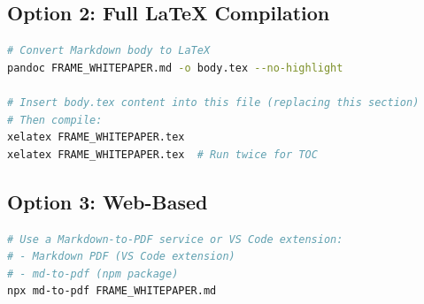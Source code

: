 \documentclass[11pt,a4paper]{article}
\begin{document}
\subsection*{Option 2: Full LaTeX Compilation}
\begin{lstlisting}[language=bash]
# Convert Markdown body to LaTeX
pandoc FRAME_WHITEPAPER.md -o body.tex --no-highlight

# Insert body.tex content into this file (replacing this section)
# Then compile:
xelatex FRAME_WHITEPAPER.tex
xelatex FRAME_WHITEPAPER.tex  # Run twice for TOC
\end{lstlisting}

\subsection*{Option 3: Web-Based}
\begin{lstlisting}[language=bash]
# Use a Markdown-to-PDF service or VS Code extension:
# - Markdown PDF (VS Code extension)
# - md-to-pdf (npm package)
npx md-to-pdf FRAME_WHITEPAPER.md
\end{lstlisting}
\end{document}

